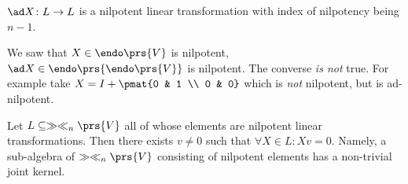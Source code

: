 \documentclass[10pt,a4paper,twoside,openany,hidelinks]{book}
\begin{document}
\begin{remark}
$\ad X \colon L \to L$
is a nilpotent linear transformation with index of nilpotency being $n-1$.
\end{remark}
\begin{remark}
We saw that $X \in \endo\prs{V}$ is nilpotent, $\ad X \in \endo\prs{\endo\prs{V}}$ is nilpotent. The converse \emph{is not} true. For example take $X = I + \pmat{0 & 1 \\ 0 & 0}$ which is \emph{not} nilpotent, but is ad-nilpotent.
\end{remark}
\begin{theorem}
Let $L \subseteq \gg \ll_n\prs{V}$ all of whose elements are nilpotent linear transformations. Then there exists $v \neq 0$ such that $\forall X \in L \colon Xv = 0$. Namely, a sub-algebra of $\gg \ll_n\prs{V}$ consisting of nilpotent elements has a non-trivial joint kernel.
\end{theorem}
\end{document}
